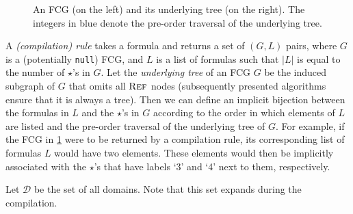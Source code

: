 \begin{figure}
\centering
\begin{subfigure}{0.49\textwidth}
\centering
{}
\end{subfigure}
\begin{subfigure}{0.49\textwidth}
\centering
{}
\end{subfigure}
\caption{An FCG (on the left) and its underlying tree (on the right). The integers in blue denote the pre-order traversal of the underlying tree.}
\label{fig:ordering}
\end{figure}

A \emph{(compilation) rule} takes a formula and returns a set of $(G, L)$ pairs, where $G$ is a (potentially \texttt{null}) FCG, and $L$ is a list of formulas such that $|L|$ is equal to the number of $\star$'s in $G$. Let the \emph{underlying tree} of an FCG $G$ be the induced subgraph of $G$ that omits all $\operatorname{\textsc{Ref}}$ nodes (subsequently presented algorithms ensure that it is always a tree). Then we can define an implicit bijection between the formulas in $L$ and the $\star$'s in $G$ according to the order in which elements of $L$ are listed and the pre-order traversal of the underlying tree of $G$. For example, if the FCG in \cref{fig:ordering} were to be returned by a compilation rule, its corresponding list of formulas $L$ would have two elements. These elements would then be implicitly associated with the $\star$'s that have labels `3' and `4' next to them, respectively.

Let $\mathcal{D}$ be the set of all domains. Note that this set expands during the compilation.

